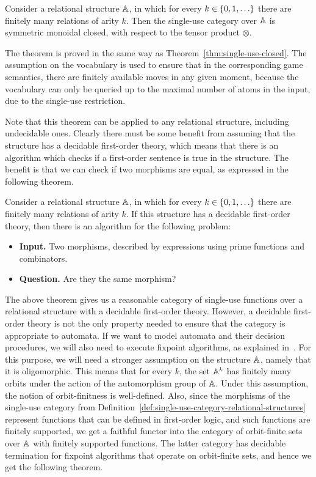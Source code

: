 \begin{theorem}\label{thm:single-use-closed-relational-structures}
    Consider a relational structure $\mathbb A$, in which for every $k \in \{0,1,\ldots\}$ there are finitely many relations of arity $k$. Then the single-use category over $\mathbb A$ is symmetric monoidal closed, with respect to the tensor product $\otimes$.
\end{theorem}

The theorem is proved in the same way as Theorem~\ref{thm:single-use-closed}.  The assumption on the vocabulary is used to ensure that in the corresponding game semantics, there are finitely available moves in any given moment, because the vocabulary can only be queried up to the maximal number of atoms in the input, due to the single-use restriction.

Note that this  theorem can be applied to any relational structure, including undecidable ones. Clearly there must be some benefit from assuming that the structure has a decidable first-order theory, which means that there is an algorithm which checks if a first-order sentence is true in the structure. 
The benefit is that we can check if two morphisms are equal, as expressed in the following theorem. 

\begin{theorem}
    Consider a relational structure $\mathbb A$, in which for every $k \in \{0,1,\ldots\}$ there are finitely many relations of arity $k$. If this structure has a decidable first-order theory, then there is an algorithm for the following problem:
    \begin{itemize}
        \item {\bf Input.} Two morphisms, described by expressions using prime functions and combinators.
        \item {\bf Question.} Are they the same morphism?
    \end{itemize}
\end{theorem}




The above theorem gives us a reasonable category of single-use functions over a relational structure with a decidable first-order theory. 
However, a decidable first-order theory is not the only property needed to ensure that the category is appropriate to automata. If we want to model automata and their decision procedures, we will also need to execute fixpoint algorithms, as explained in~\cite{bojanczyk_slightly2018}. For this purpose, we will need a stronger assumption on the structure $\mathbb A$, namely that it is oligomorphic. This means that for every $k$, the set $\mathbb A^k$ has finitely many orbits under the action of the automorphism group of $\mathbb A$. Under this assumption,  the notion of orbit-finitness is well-defined. Also, since the morphisms of the single-use category from Definition~\ref{def:single-use-category-relational-structures} represent functions that can be defined in first-order logic, and such functions are finitely supported, we get a faithful functor into the category of orbit-finite sets over $\mathbb A$ with finitely supported functions. The latter category has decidable termination for fixpoint algorithms that operate on orbit-finite sets, and hence we get the following theorem. 

